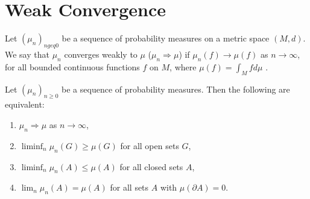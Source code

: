 
\chapter{Weak Convergence}
\label{cha:weak-convergence}

\begin{defn}
  \label{defn:weak_convergence:1}
  Let $(\mu_{n})_{n geq 0}$ be a sequence of probability measures on a
  metric space $(M, d)$.   We say that $\mu_{n}$ converges weakly to
  $\mu$ ($\mu_{n} \Rightarrow \mu$) if $\mu_{n}(f) \rightarrow \mu(f)$
  as $n \rightarrow \infty$, for all bounded continuous functions $f$
  on $M$, where $\mu(f) = \int_{M} f d\mu$ .
\end{defn}

\begin{exmp}
  \label{defn:weak_convergence:1}
\end{exmp}

\begin{thm}
  \label{defn:weak_convergence:1}
  Let $(\mu_{n})_{n \geq 0}$ be a sequence of probability measures.
  Then the following are equivalent:
  \begin{enumerate}
  \item $\mu_{n} \Rightarrow \mu$ as $n \rightarrow \infty$,
  \item $\liminf_{n} \mu_{n}(G) \geq \mu(G)$ for all open sets $G$,
  \item $\liminf_{n} \mu_{n}(A) \leq \mu(A)$ for all closed sets $A$,
  \item $\lim_{n} \mu_{n}(A) = \mu(A)$ for all sets $A$ with
    $\mu(\partial A) = 0$.
  \end{enumerate}
\end{thm}

